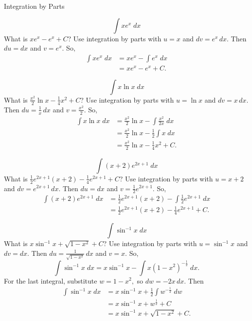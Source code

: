 \documentclass{article}
\begin{document}
\begin{category}{Integration by Parts}

  \begin{clue}[write]
    \[ \int x e^{x} \; dx \]
  \response
    What is $x e^{x} - e^{x} + C$?
  \solution
    Use integration by parts with $u=x$ and $dv=e^{x}\,dx.$ Then $du=dx$ and $v=e^{x}.$ So,
    \begin{align*}
    \int x e^{x} \; dx
    &= x e^{x} - \int e^{x} \; dx \\
    &= x e^{x} - e^{x} + C.
    \end{align*}
  \end{clue}

  \begin{clue}[write]
    \[ \int x \ln x \; dx \]
  \response
    What is $\frac{x^{2}}{2} \ln x - \frac{1}{4} x^{2} + C$?
  \solution
    Use integration by parts with $u=\ln x$ and $dv=x\,dx.$ Then $du=\frac{1}{x}\,dx$ and $v=\frac{x^{2}}{2}.$ So,
    \begin{align*}
    \int x \ln x \; dx
    &= \frac{x^{2}}{2} \ln x - \int \frac{x^{2}}{2x} \; dx \\
    &= \frac{x^{2}}{2} \ln x - \frac{1}{2} \int x \; dx \\
    &= \frac{x^{2}}{2} \ln x - \frac{1}{4} x^{2} + C.
    \end{align*}
  \end{clue}

  \begin{clue}[write]
    \[ \int (x+2) e^{2x+1} \; dx \]
  \response
    What is $\frac{1}{2}e^{2x+1}(x+2) - \frac{1}{4}e^{2x+1} + C$?
  \solution
    Use integration by parts with $u=x+2$ and $dv=e^{2x+1}\,dx.$ Then $du=dx$ and $v=\frac{1}{2}e^{2x+1}.$ So,
    \begin{align*}
    \int (x+2) e^{2x+1} \; dx
    &= \frac{1}{2}e^{2x+1}(x+2) - \int \frac{1}{2}e^{2x+1} \; dx \\
    &= \frac{1}{2}e^{2x+1}(x+2) - \frac{1}{4}e^{2x+1} + C.
    \end{align*}
  \end{clue}

  \begin{clue}[write]
    \[ \int \sin^{-1} x \; dx \]
  \response
    What is $x\sin^{-1} x + \sqrt{1-x^{2}} + C$?
  \solution
    Use integration by parts with $u=\sin^{-1} x$ and $dv=dx.$ Then $du=\frac{1}{\sqrt{1-x^{2}}}\,dx$ and $v=x.$ So,
    \[
    \int \sin^{-1} x \; dx = x\sin^{-1} x - \int x (1-x^{2})^{-\frac{1}{2}} \; dx.
    \]
    For the last integral, substitute $w=1-x^{2},$ so $dw=-2x\,dx.$ Then
    \begin{align*}
    \int \sin^{-1} x \; dx
    &= x\sin^{-1} x + \frac{1}{2} \int w^{-\frac{1}{2}} \; dw \\
    &= x\sin^{-1} x + w^{\frac{1}{2}} + C \\
    &= x\sin^{-1} x + \sqrt{1-x^{2}} + C.
    \end{align*}
  \end{clue}


\end{category}
\end{document}
